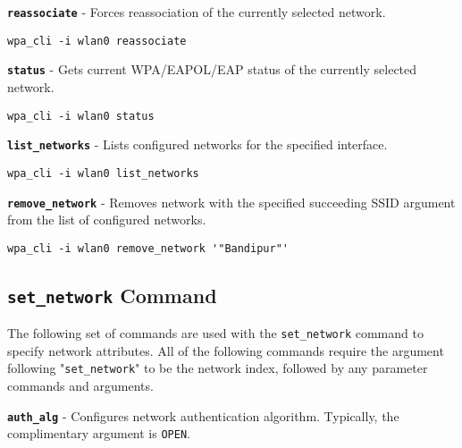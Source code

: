 \noindent
{} \texttt{\bfseries reassociate} - Forces reassociation of the currently selected network.

	\begin{lstlisting}[style=framelesstext]
	wpa_cli -i wlan0 reassociate
	\end{lstlisting}


\noindent
{} \texttt{\bfseries status} - Gets current WPA/EAPOL/EAP status of the currently selected network.

	\begin{lstlisting}[style=framelesstext]
	wpa_cli -i wlan0 status
	\end{lstlisting}


\noindent
{} \texttt{\bfseries list\_networks} - Lists configured networks for the specified interface.

	\begin{lstlisting}[style=framelesstext]
	wpa_cli -i wlan0 list_networks
	\end{lstlisting}


\noindent
{} \texttt{\bfseries remove\_network} - Removes network with the specified succeeding SSID argument from the list of configured networks.

	\begin{lstlisting}[style=framelesstext]
	wpa_cli -i wlan0 remove_network '"Bandipur"'
	\end{lstlisting}


\subsection{\texttt{set\_network} Command}
\label{sub:setnetwork}
The following set of commands are used with the \Verb|set_network| command to specify network attributes. All of the following commands require the argument following "\Verb|set_network|" to be the network index, followed by any parameter commands and arguments. \\


\noindent
{} \texttt{\bfseries auth\_alg} - Configures network authentication algorithm. Typically, the complimentary argument is \texttt{OPEN}.

